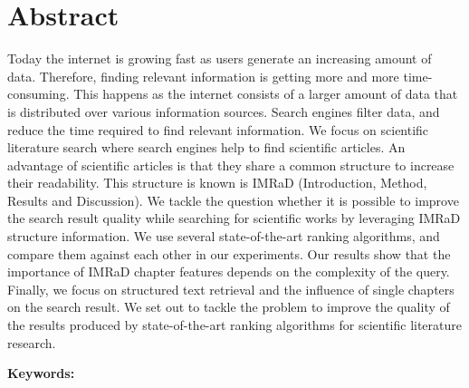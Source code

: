 \chapter*{Abstract}
\label{cha:abstract}

Today the internet is growing fast as users generate an increasing amount of data. Therefore, finding relevant information is getting more and more time-consuming. This happens as the internet consists of a larger amount of data that is distributed over various information sources. Search engines filter data, and reduce the time required to find relevant information. We focus on scientific literature search where search engines help to find scientific articles. An advantage of scientific articles is that they share a common structure to increase their readability. This structure is known is IMRaD (Introduction, Method, Results and Discussion). We tackle the question whether it is possible to improve the search result quality while searching for scientific works by leveraging IMRaD structure information. We use several state-of-the-art ranking algorithms, and compare them against each other in our experiments. Our results show that the importance of IMRaD chapter features depends on the complexity of the query. Finally, we focus on structured text retrieval and the influence of single chapters on the search result. We set out to tackle the problem to improve the quality of the results produced by state-of-the-art ranking algorithms for scientific literature research.



\textbf{Keywords:} \mykeywords{}